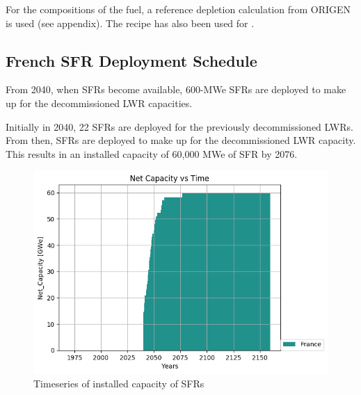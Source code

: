 For the compositions of the fuel, a reference depletion calculation
from ORIGEN is used (see appendix). The recipe has also been used for
\cite{wilson_adoption_2009}.

\subsection{French \gls{SFR} Deployment Schedule}

From 2040, when \gls{SFR}s become available,
600-MWe \gls{SFR}s are deployed to make up for the 
decommissioned \gls{LWR} capacities.

Initially in 2040, 22 \gls{SFR}s
are deployed for the previously decommissioned
\gls{LWR}s. From then, \glspl{SFR} are deployed to
make up for the decommissioned \gls{LWR} capacity.
This results in an installed capacity of 60,000 MWe
of \gls{SFR} by 2076.

\begin{figure}[htbp!]
	\begin{center}
		\includegraphics[scale=0.7]{./images/french-transition/power_plot.png}
	\end{center}
	\caption{Timeseries of installed capacity of \gls{SFR}s}
	\label{fig:sfr_cap}
\end{figure}


